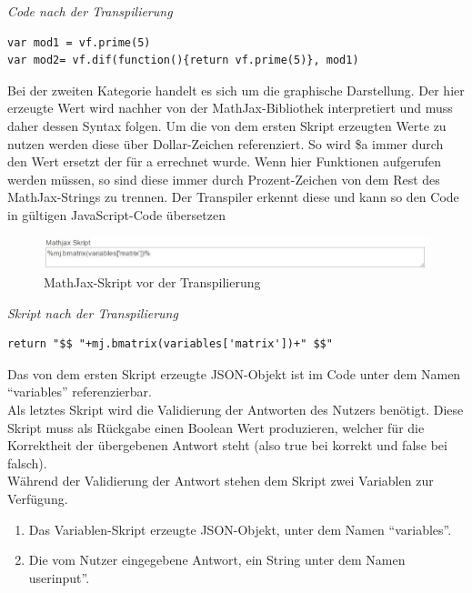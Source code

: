 \emph{Code nach der Transpilierung}
\begin{lstlisting}
var mod1 = vf.prime(5)
var mod2= vf.dif(function(){return vf.prime(5)}, mod1)
\end{lstlisting}


Bei der zweiten Kategorie handelt es sich um die graphische Darstellung. Der hier erzeugte Wert wird nachher von der MathJax-Bibliothek interpretiert und muss daher dessen Syntax folgen. Um die von dem ersten Skript erzeugten Werte zu nutzen werden diese über Dollar-Zeichen referenziert. So wird \$a immer durch den Wert ersetzt der für a errechnet wurde.  Wenn hier Funktionen aufgerufen werden müssen, so sind diese immer durch Prozent-Zeichen von dem Rest des MathJax-Strings zu trennen. Der Transpiler erkennt diese und kann so den Code in gültigen JavaScript-Code übersetzen \\

\begin{figure}[htp]     %
\centering
\includegraphics[width=1\textwidth]{bilder/MathJaxPreTrans} 
\caption[MathJax-Skript vor der Transpilierung]{MathJax-Skript vor der Transpilierung}
\end{figure} 

\emph{Skript nach der Transpilierung}
\begin{lstlisting}
return "$$ "+mj.bmatrix(variables['matrix'])+" $$"
\end{lstlisting}
Das von dem ersten Skript erzeugte JSON-Objekt ist im Code unter dem Namen ``variables'' referenzierbar. \\

Als letztes Skript wird die Validierung der Antworten des Nutzers benötigt. Diese Skript muss als Rückgabe einen Boolean Wert produzieren, welcher für die Korrektheit der übergebenen Antwort steht (also true bei korrekt und false bei falsch). \\
Während der Validierung der Antwort stehen dem Skript zwei Variablen zur Verfügung.\\
\begin{enumerate}
\item Das Variablen-Skript erzeugte JSON-Objekt, unter dem Namen ``variables''.
\item Die vom Nutzer eingegebene Antwort, ein String unter dem Namen userinput''.
\end{enumerate}

